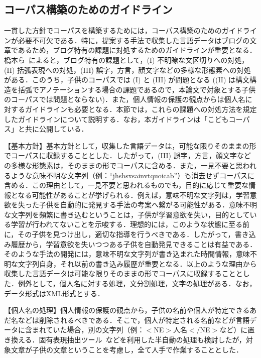 \documentclass[japanese]{jnlp_1.4}
\begin{document}
\subsection{コーパス構築のためのガイドライン}\label{subsec:guidline}

 一貫した方針でコーパスを構築するためには，コーパス構築のためのガイドラインが必要不可欠である．特に，提案する手法で収集した言語データはブログの文章であるため，ブログ特有の課題に対処するためのガイドラインが重要となる．橋本ら~\cite{hasimoto}によると，ブログ特有の課題として，(I) 不明瞭な文区切りへの対処，(II) 括弧表現への対処，(III) 誤字，方言，顔文字などの多様な形態素への対処がある．このうち，子供のコーパスでは (I) と (III) が問題となる ((II) は構文構造を括弧でアノテーションする場合の課題であるので，本論文で対象とする子供のコーパスでは問題とならない)．また，個人情報の保護の観点からは個人名に対するガイドラインも必要となる．本節では，これらの課題への対処方法を規定したガイドラインについて説明する．なお，本ガイドラインは「こどもコーパス」と共に公開している．

  【基本方針】基本方針として，収集した言語データは，可能な限りそのままの形でコーパスに収録することとした．したがって，(III) 誤字，方言，顔文字などの多様な形態素は，そのままの形でコーパスに含める．また，一見不要と思われるような意味不明な文字列（例：``jhshsxsainvtquoicab''）も消去せずコーパスに含める．この理由として，一見不要と思われるものでも，目的に応じて重要な情報となる可能性があることが挙げられる．例えば，意味不明な文字列は，学習意欲を失った子供を自動的に発見する手法の考案へ繋がる可能性がある．意味不明な文字列を頻繁に書き込むということは，子供が学習意欲を失い，目的としている学習が行われてないことを示唆する．理想的には，このような状態に至る前に，その子供を見つけ出し，適切な指導を行うべきである．したがって，書き込み履歴から，学習意欲を失いつつある子供を自動発見できることは有益である．そのような手法の開発には，意味不明な文字列が書き込まれた時間情報，意味不明な文字列自身，それ以前の書き込み履歴が重要となる．以上のような理由から収集した言語データは可能な限りそのままの形でコーパスに収録することとした．例外として，個人名に対する処理，文分割処理，文字の処理がある．なお，データ形式はXML形式とする．


  【個人名の処理】個人情報の保護の観点から，子供の名前や個人が特定できるあだ名などは削除されるべきである．そこで，個人が特定される名前などが言語データに含まれていた場合，別の文字列（例：$<$NE$>$人名$<$/NE$>$など）に置き換える．固有表現抽出ツール~\cite{masui}などを利用した半自動の処理も検討したが，対象文章が子供の文章ということを考慮し，全て人手で作業することとした．
\end{document}
